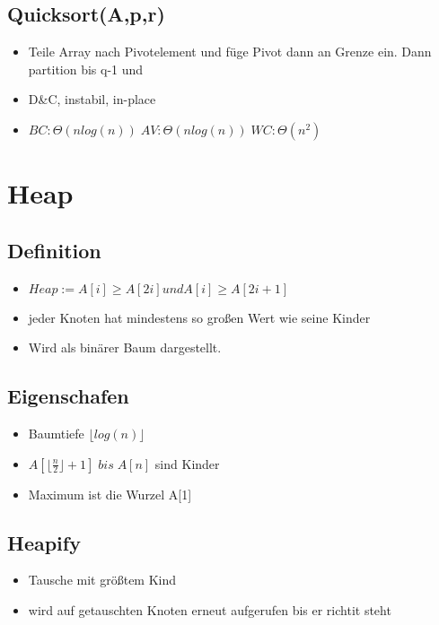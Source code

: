 \documentclass{article}
\begin{document}
\subsection{Quicksort(A,p,r)}
\begin{itemize}
\item Teile Array nach Pivotelement und f{\"u}ge Pivot dann an Grenze ein. Dann partition bis q-1 und 
\item D\&C, instabil, in-place 
\item $BC: \Theta(nlog(n))\; AV:\Theta(nlog(n))\; WC: \Theta(n^2)\;$
\end{itemize}

\section{Heap}
\subsection{Definition}

\begin{itemize}
\item $ Heap := A[i] \geq A[2i] und A[i] \geq A[2i+1]$ \\
\item jeder Knoten hat mindestens so gro\ss en Wert wie seine Kinder \\
\item Wird als bin{\"a}rer Baum dargestellt. \newline
\end{itemize}

\subsection{Eigenschafen}
\begin{itemize}
\item Baumtiefe $\lfloor log(n)\rfloor$
\item $A[\lfloor \frac{n}{2} \rfloor +1] \; bis \; A[n]$ sind Kinder
\item Maximum ist die Wurzel A[1]
\end{itemize}
\subsection{Heapify}
\begin{itemize}
\item Tausche mit gr{\"o}\ss tem Kind
\item wird auf getauschten Knoten erneut aufgerufen bis er richtit steht
\end{itemize}
\end{document}
